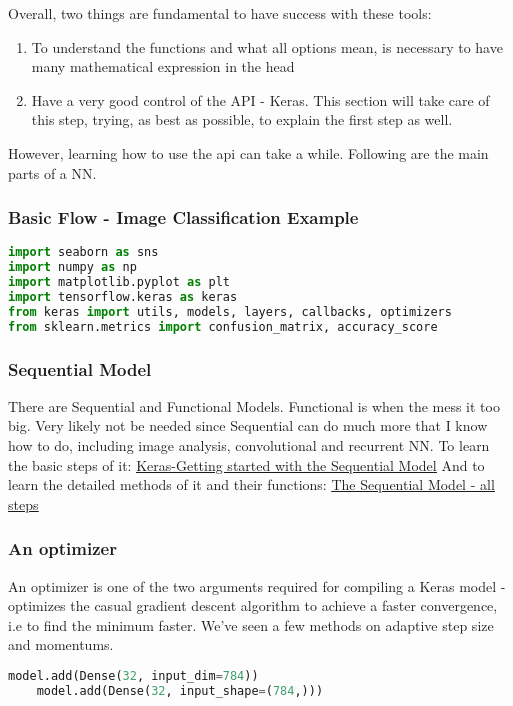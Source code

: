 Overall, two things are fundamental to have success with these tools: 
\begin{enumerate}
    \item To understand the functions and what all options mean, is necessary to have many mathematical expression in the head
    \item Have a very good control of the API - Keras. This section will take care of this step, trying, as best as possible, to explain the first step as well.
\end{enumerate}

However, learning how to use the api can take a while. Following are the main parts of a NN.

\subsubsection{Basic Flow - Image Classification Example}

\begin{lstlisting}[language = python]
import seaborn as sns
import numpy as np
import matplotlib.pyplot as plt
import tensorflow.keras as keras 
from keras import utils, models, layers, callbacks, optimizers
from sklearn.metrics import confusion_matrix, accuracy_score

\end{lstlisting}

\subsubsection{Sequential Model}
There are Sequential and Functional Models. Functional is when the mess it too big. Very likely not be needed since Sequential can do much more that I know how to do, including image analysis, convolutional and recurrent NN.
To learn the basic steps of it:
\href{https://keras.io/getting-started/sequential-model-guide/}{\ul{Keras-Getting started with the Sequential Model}}
And to learn the detailed methods of it and their functions:
\href{https://keras.io/models/sequential/}{\ul{The Sequential Model - all steps}}

\subsubsection{An optimizer}

An optimizer is one of the two arguments required for compiling a Keras model - optimizes the casual gradient descent algorithm to achieve a faster convergence, i.e to find the minimum faster. We've seen a few methods on adaptive step size and momentums.
\begin{lstlisting}[language=python]
    model.add(Dense(32, input_dim=784))
    model.add(Dense(32, input_shape=(784,)))    
\end{lstlisting}

